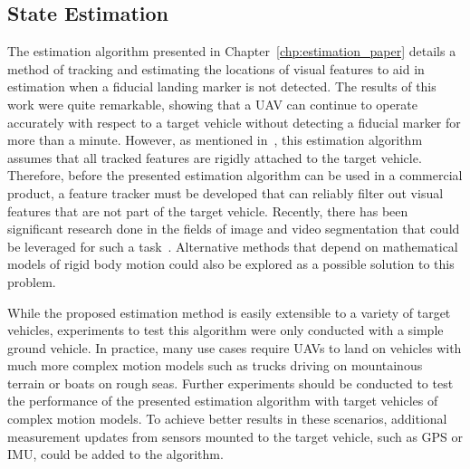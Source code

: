 \subsection{State Estimation}
The estimation algorithm presented in Chapter~\ref{chp:estimation_paper} details
a method of tracking and estimating the locations of visual features 
to aid in estimation when a fiducial landing marker is
not detected. The results of this work were quite remarkable, showing that a UAV
can continue to operate accurately with respect to a target vehicle without
detecting a fiducial marker for more
than a minute. However, as mentioned in~, this estimation algorithm
assumes that all tracked features are rigidly attached to the target vehicle.
Therefore, before the presented estimation algorithm can be used in a commercial
product, a feature tracker must be developed that can reliably filter out visual
features that are not part of the target vehicle.
Recently, there has been significant research done
in the fields of image and video segmentation that could be leveraged for such a
task~\cite{chen2018encoder}. Alternative methods that depend on
mathematical models of rigid body motion could also be explored as a possible
solution to this problem.

While the proposed estimation method is easily extensible to a variety of
target vehicles, experiments to test this algorithm were only conducted
with a simple ground vehicle.
In practice, many use cases require UAVs to land on
vehicles with much more complex motion models such as trucks driving on
mountainous terrain or boats on rough seas.
Further experiments should be conducted to test the performance of the presented
estimation algorithm with target vehicles of complex motion models.
To achieve better results in these scenarios, additional measurement updates
from sensors mounted to the target vehicle, such as GPS or IMU,
could be added  to the algorithm.

